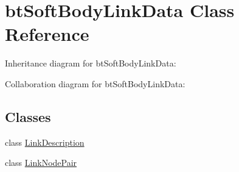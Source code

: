\hypertarget{classbt_soft_body_link_data}{\section{bt\+Soft\+Body\+Link\+Data Class Reference}
\label{classbt_soft_body_link_data}
}


Inheritance diagram for bt\+Soft\+Body\+Link\+Data\+:


Collaboration diagram for bt\+Soft\+Body\+Link\+Data\+:
\subsection*{Classes}
\begin{DoxyCompactItemize}
\item 
class \hyperlink{classbt_soft_body_link_data_1_1_link_description}{Link\+Description}
\item 
class \hyperlink{classbt_soft_body_link_data_1_1_link_node_pair}{Link\+Node\+Pair}
\end{DoxyCompactItemize}

